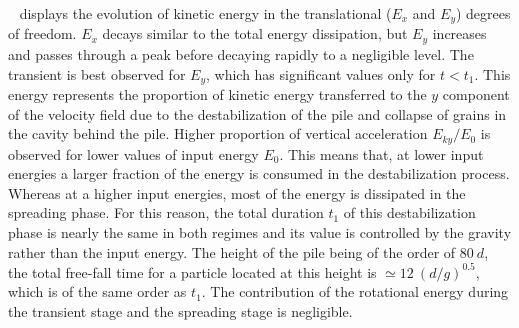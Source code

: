 ~ displays the evolution of kinetic energy 
in the translational ($E_x$ and $E_y$) degrees of freedom. $E_x$ decays similar 
to the total energy dissipation, but $E_y$ increases and passes through a peak 
before decaying rapidly to a negligible level. The transient is best 
observed for $E_y$, which has significant values only for $t< t_1$. This energy 
represents the proportion of kinetic energy transferred to the $y$ component of 
the velocity field  due to the destabilization of the pile and collapse of 
grains in the cavity behind the pile. Higher proportion of vertical 
acceleration $E_{ky}/E_0$ is observed for lower values of input energy $E_0$. 
This means that, at lower input energies a larger fraction of the energy is 
consumed in the destabilization process. Whereas at a higher input energies, 
most of the energy is dissipated in the spreading phase. For this reason, the 
total duration $t_1$ of this destabilization phase is nearly the same in 
both regimes and its value is controlled by the gravity rather than the input 
energy. The height of the pile being of the order of $80 \ d$, the total 
free-fall time for a particle located at this height is $\simeq 12 \ 
(d/g)^{0.5}$, which is of the same order as $t_1$. The contribution of the  
rotational energy during the transient stage and the spreading stage is 
negligible. 

